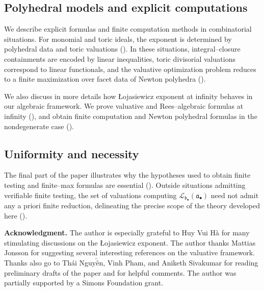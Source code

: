 \documentclass[12pt]{amsart}
\renewcommand{\a}{\mathfrak{a}}
\renewcommand{\b}{\mathfrak{b}}
\newcommand{\Loj}{\mathcal{L}} %
\newcommand{\abul}{{\a_\bullet}}
\newcommand{\bbul}{{\b_\bullet}}
\theoremstyle{plain}
\theoremstyle{definition}
\numberwithin{equation}{section}
\begin{document}
\subsection{Polyhedral models and explicit computations}

We describe explicit formulas and finite computation methods in combinatorial situations.  For monomial and toric ideals, the exponent is determined by polyhedral data and toric valuations ().  
In these situations, integral--closure containments are encoded by linear inequalities,
toric divisorial valuations correspond to linear functionals, and the valuative optimization
problem reduces to a finite maximization over facet data of Newton polyhedra
().

We also discuss in more details how \L{}ojasiewicz exponent at infinity behaves in our algebraic framework.  We prove valuative and Rees--algebraic formulas at infinity (), and obtain finite computation and Newton polyhedral formulas in the nondegenerate case ().

\subsection{Uniformity and necessity}

The final part of the paper illustrates why the hypotheses used to obtain finite testing and
finite--max formulas are essential (). 
Outside situations admitting verifiable finite testing, the set of valuations computing
$\Loj_{\bbul}(\abul)$ need not admit any a priori finite reduction, delineating the precise
scope of the theory developed here ().




\medskip
\noindent\textbf{Acknowledgment.}
The author is especially grateful to Huy Vui H\`a for many stimulating discussions on the \L{}ojasiewicz exponent. 
The author thanks Mattias Jonsson for suggesting several interesting references on the valuative framework. 
Thanks also go to Th\'ai Nguy$\tilde{\text{\^e}}$n, Vinh Pham, and Aniketh Sivakumar for reading preliminary drafts of the paper and for helpful comments. 
The author was partially supported by a Simons Foundation grant.
\end{document}
